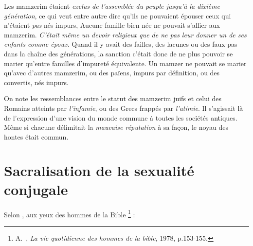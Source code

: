  Les mamzerim étaient \emph{exclus de l'assemblée du peuple jusqu'à la dixième génération}, ce qui veut entre autre dire qu'ils ne pouvaient épouser ceux qui n'étaient \emph{pas} nés impurs, Aucune famille bien née ne pouvait s'allier aux mamzerim. \emph{C'était même un devoir religieux que de ne pas leur donner un de ses enfants comme époux.} Quand il y avait des failles, des lacunes ou des faux-pas dans la chaîne des générations, la sanction c'était donc de ne plus pouvoir se marier qu'entre familles d'impureté équivalente. Un mamzer ne pouvait se marier qu'avec d'autres mamzerim, ou des païens, impurs par définition, ou des convertis, nés impurs. 

 On note les ressemblances entre le statut des mamzerim juifs et celui des Romains atteints par \emph{l'infamie}, ou des Grecs frappés par \emph{l'atimie}. Il s'agissait là de l'expression d'une vision du monde commune à toutes les sociétés antiques. Même si chacune délimitait la \emph{mauvaise réputation} à sa façon, le noyau des hontes était commun. 




\section{Sacralisation de la sexualité conjugale}

 

 Selon , aux yeux des hommes de la Bible%
\footnote{A.~, \emph{La vie quotidienne des hommes de la bible}, 1978, p.153-155.}%
 :

